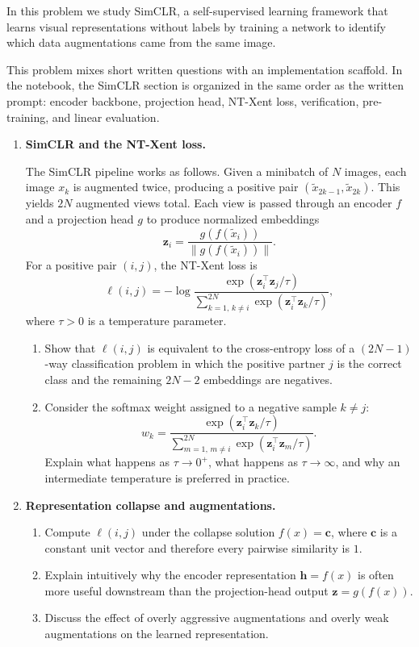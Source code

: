 \documentclass[submit]{harvardml}
\begin{document}
\begin{problem}
In this problem we study SimCLR, a self-supervised learning framework that learns visual representations without labels by training a network to identify which data augmentations came from the same image.

This problem mixes short written questions with an implementation scaffold. In the notebook, the SimCLR section is organized in the same order as the written prompt: encoder backbone, projection head, NT-Xent loss, verification, pre-training, and linear evaluation.

\begin{enumerate}[leftmargin=*]
\item \textbf{SimCLR and the NT-Xent loss.}

The SimCLR pipeline works as follows. Given a minibatch of \(N\) images, each image \(x_k\) is augmented twice, producing a positive pair \((\tilde{x}_{2k-1}, \tilde{x}_{2k})\). This yields \(2N\) augmented views total. Each view is passed through an encoder \(f\) and a projection head \(g\) to produce normalized embeddings
\[
\mathbf{z}_i = \frac{g(f(\tilde{x}_i))}{\|g(f(\tilde{x}_i))\|}.
\]
For a positive pair \((i,j)\), the NT-Xent loss is
\[
\ell(i,j) = -\log \frac{\exp(\mathbf{z}_i^\top \mathbf{z}_j / \tau)}{\sum_{k=1,\,k\neq i}^{2N} \exp(\mathbf{z}_i^\top \mathbf{z}_k / \tau)},
\]
where \(\tau > 0\) is a temperature parameter.

\begin{enumerate}[label=(\alph*)]
    \item Show that \(\ell(i,j)\) is equivalent to the cross-entropy loss of a \((2N-1)\)-way classification problem in which the positive partner \(j\) is the correct class and the remaining \(2N-2\) embeddings are negatives.
    \item Consider the softmax weight assigned to a negative sample \(k \neq j\):
    \[
    w_k = \frac{\exp(\mathbf{z}_i^\top \mathbf{z}_k / \tau)}{\sum_{m=1,\,m\neq i}^{2N} \exp(\mathbf{z}_i^\top \mathbf{z}_m / \tau)}.
    \]
    Explain what happens as \(\tau \to 0^+\), what happens as \(\tau \to \infty\), and why an intermediate temperature is preferred in practice.
\end{enumerate}

\item \textbf{Representation collapse and augmentations.}
\begin{enumerate}[label=(\alph*)]
    \item Compute \(\ell(i,j)\) under the collapse solution \(f(x)=\mathbf c\), where \(\mathbf c\) is a constant unit vector and therefore every pairwise similarity is \(1\).
    \item Explain intuitively why the encoder representation \(\mathbf h=f(x)\) is often more useful downstream than the projection-head output \(\mathbf z=g(f(x))\).
    \item Discuss the effect of overly aggressive augmentations and overly weak augmentations on the learned representation.
\end{enumerate}


\end{enumerate}
\end{problem}
\end{document}
